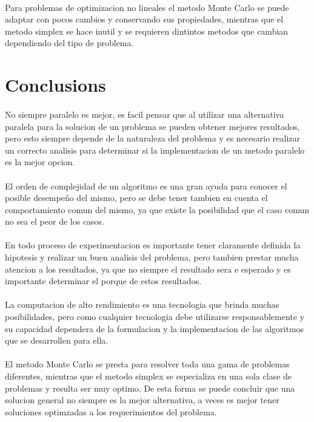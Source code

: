 \documentclass[runningheads]{llncs}
\begin{document}
\paragraph{}
Para problemas de optimizacion no lineales el metodo Monte Carlo se puede adaptar con pocos cambios y conservando sus propiedades, mientras que el metodo simplex se hace inutil y se requieren dintintos metodos que cambian dependiendo del tipo de problema.

\section{Conclusions}
\paragraph{}
No siempre paralelo es mejor, es facil pensar que al utilizar una alternativa paralela para la solucion de un problema se pueden obtener mejores resultados, pero esto siempre depende de la naturaleza del problema y es necesario realizar un correcto analisis para determinar si la implementacion de un metodo paralelo es la mejor opcion.
\paragraph{}
El orden de complejidad de un algoritmo es una gran ayuda para conocer el posible desempeño del mismo, pero se debe tener tambien en cuenta el comportamiento comun del mismo, ya que existe la posibilidad que el caso comun no sea el peor de los casos.
\paragraph{}
En todo proceso de experimentacion es importante tener claramente definida la hipotesis y realizar un buen analisis del problema, pero tambien prestar mucha atencion a los resultados, ya que no siempre el resultado sera e esperado y es importante determinar el porque de estos resultados.
\paragraph{}
La computacion de alto rendimiento es una tecnologia que brinda muchas posibilidades, pero como cualquier tecnologia debe utilizarse responsablemente y su capacidad dependera de la formulacion y la implementacion de las algoritmos que se desarrollen para ella. 
\paragraph{}
El metodo Monte Carlo se presta para resolver toda una gama de problemas diferentes, mientras que el metodo simplex se especializa en una sola clase de problemas y resulta ser muy optimo. De esta forma se puede concluir que una solucion general no siempre es la mejor alternativa, a veces es mejor tener soluciones optimzadas a los requerimientos del problema. 
\end{document}
